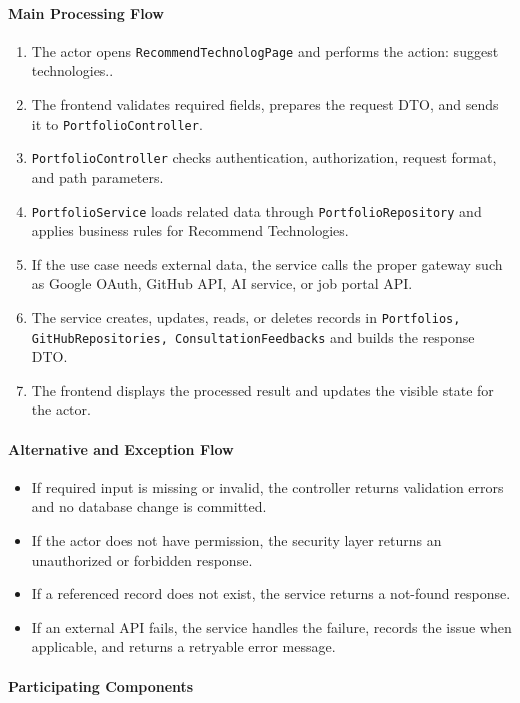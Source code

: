 \paragraph{Main Processing Flow}

\begin{enumerate}
    \item The actor opens \texttt{RecommendTechnologPage} and performs the action: suggest technologies..
    \item The frontend validates required fields, prepares the request DTO, and sends it to \texttt{PortfolioController}.
    \item \texttt{PortfolioController} checks authentication, authorization, request format, and path parameters.
    \item \texttt{PortfolioService} loads related data through \texttt{PortfolioRepository} and applies business rules for Recommend Technologies.
    \item If the use case needs external data, the service calls the proper gateway such as Google OAuth, GitHub API, AI service, or job portal API.
    \item The service creates, updates, reads, or deletes records in \texttt{Portfolios, GitHubRepositories, ConsultationFeedbacks} and builds the response DTO.
    \item The frontend displays the processed result and updates the visible state for the actor.
\end{enumerate}

\paragraph{Alternative and Exception Flow}

\begin{itemize}
    \item If required input is missing or invalid, the controller returns validation errors and no database change is committed.
    \item If the actor does not have permission, the security layer returns an unauthorized or forbidden response.
    \item If a referenced record does not exist, the service returns a not-found response.
    \item If an external API fails, the service handles the failure, records the issue when applicable, and returns a retryable error message.
\end{itemize}

\paragraph{Participating Components}

